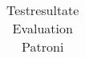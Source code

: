 \begin{table}[H]
{\begin{tabular}{lrllll}
\bottomrule
\end{tabular}
}
\caption{Testresultate Evaluation Patroni} \label{evaluation_tests_patroni}
\end{table}
